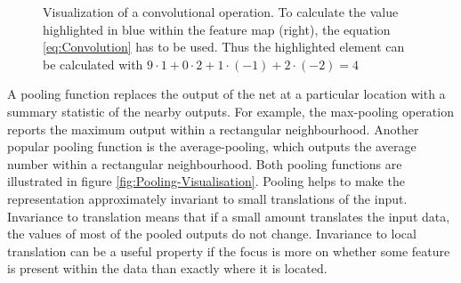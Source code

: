 \begin{figure}[htbp]
    \centering
    \caption[Visualization of a convolutional operation]{Visualization of a convolutional operation. To calculate the value highlighted in blue within the feature map (right), the equation \ref{eq:Convolution} has to be used. Thus the highlighted element can be calculated with $9\cdot 1 + 0\cdot 2 + 1\cdot (-1) + 2\cdot (-2) = 4$}
    \label{fig:Convolution-Visualisation}
\end{figure}
\noindent
A pooling function replaces the output of the net at a particular location with a summary statistic of the nearby outputs. For example, the max-pooling operation reports the maximum output within a rectangular neighbourhood. Another popular pooling function is the average-pooling, which outputs the average number within a rectangular neighbourhood. Both pooling functions are illustrated in figure \ref{fig:Pooling-Visualisation}. Pooling helps to make the representation approximately invariant to small translations of the input. Invariance to translation means that if a small amount translates the input data, the values of most of the pooled outputs do not change. Invariance to local translation can be a useful property if the focus is more on whether some feature is present within the data than exactly where it is located.

